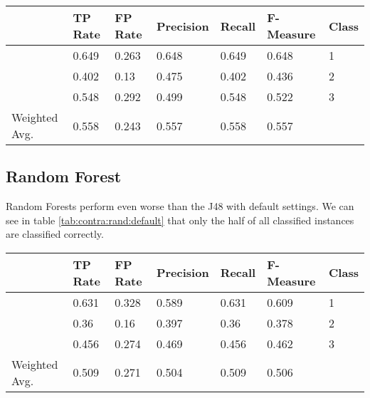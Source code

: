 \documentclass[paper=a4, fontsize=11pt]{scrartcl} %
\numberwithin{equation}{section} %
\numberwithin{figure}{section} %
\numberwithin{table}{section} %
\begin{document}
 
\begin{table*}[htb]\centering
  \begin{tabular*}{\columnwidth}{@{}lllllll@{}}
      \toprule 
               &  TP Rate & FP Rate & Precision & Recall & F-Measure &  Class \\ \midrule   
               &  0.649   & 0.263   & 0.648     & 0.649  & 0.648     &  1     \\    
               &  0.402   & 0.13    & 0.475     & 0.402  & 0.436     &  2     \\        
               &  0.548   & 0.292   & 0.499     & 0.548  & 0.522     &  3     \\    
Weighted Avg.  &  0.558   & 0.243   & 0.557     & 0.558  & 0.557     &        \\ \bottomrule 
    \end{tabular*}
\caption{Decision Tree on Contraceptive Data Set -- using binary splits} 
\label{tab:contra:dec:bin}
\end{table*}
\FloatBarrier

\subsection{Random Forest}
Random Forests perform even worse than the J48 with default settings. We can see in table \ref{tab:contra:rand:default} that only the half of all classified instances are classified correctly.

\begin{table*}[htb]\centering
  \begin{tabular*}{\columnwidth}{@{}lllllll@{}}
      \toprule 
               &  TP Rate & FP Rate & Precision & Recall & F-Measure  & Class  \\  \midrule      
               &  0.631   & 0.328   & 0.589     & 0.631  & 0.609      & 1      \\       
               &  0.36    & 0.16    & 0.397     & 0.36   & 0.378      & 2      \\       
               &  0.456   & 0.274   & 0.469     & 0.456  & 0.462      & 3      \\       
Weighted Avg.  &  0.509   & 0.271   & 0.504     & 0.509  & 0.506      &        \\  \bottomrule     
    \end{tabular*}
\caption{Random Forests on Contraceptive Data Set -- Default Settings} 
\label{tab:contra:rand:default}
\end{table*}
\FloatBarrier
\end{document}

